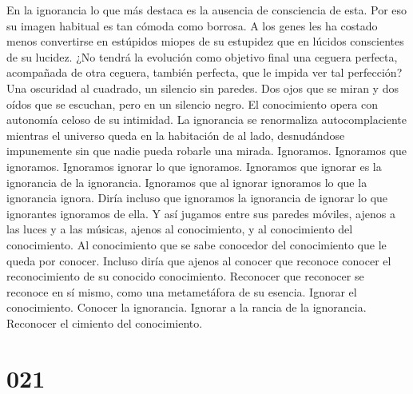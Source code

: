 \documentclass[a4paper,11pt,openright,twocolumn]{book}
\begin{document}
En la ignorancia lo que más destaca es la ausencia de consciencia de esta. Por eso su imagen habitual es tan cómoda como borrosa. A los genes les ha costado menos convertirse en estúpidos miopes de su estupidez que en lúcidos conscientes de su lucidez. ¿No tendrá la evolución como objetivo final una ceguera perfecta, acompañada de otra ceguera, también perfecta, que le impida ver tal perfección? Una oscuridad al cuadrado, un silencio sin paredes. Dos ojos que se miran y dos oídos que se escuchan, pero en un silencio negro. El conocimiento opera con autonomía celoso de su intimidad. La ignorancia se renormaliza autocomplaciente mientras el universo queda en la habitación de al lado, desnudándose impunemente sin que nadie pueda robarle una mirada. Ignoramos. Ignoramos que ignoramos. Ignoramos ignorar lo que ignoramos. Ignoramos que ignorar es la ignorancia de la ignorancia. Ignoramos que al ignorar ignoramos lo que la ignorancia ignora. Diría incluso que ignoramos la ignorancia de ignorar lo que ignorantes ignoramos de ella. Y así jugamos entre sus paredes móviles, ajenos a las luces y a las músicas, ajenos al conocimiento, y al conocimiento del conocimiento. Al conocimiento que se sabe conocedor del conocimiento que le queda por conocer. Incluso diría que ajenos al conocer que reconoce conocer el reconocimiento de su conocido conocimiento. Reconocer que reconocer se reconoce en sí mismo, como una metametáfora de su esencia. Ignorar el conocimiento. Conocer la ignorancia. Ignorar a la rancia de la ignorancia. Reconocer el cimiento del conocimiento. 

\section*{021}
\end{document}
